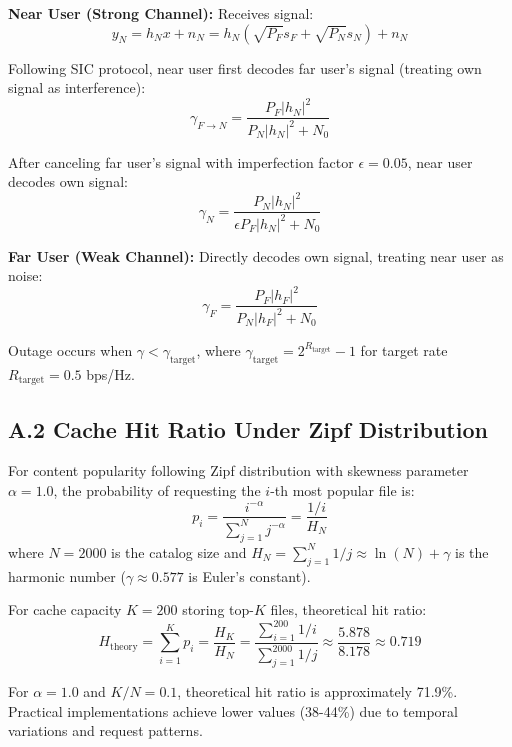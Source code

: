 \documentclass[12pt,a4paper]{article}
\begin{document}
\textbf{Near User (Strong Channel):} Receives signal:
\begin{equation}
y_N = h_N x + n_N = h_N(\sqrt{P_F} s_F + \sqrt{P_N} s_N) + n_N
\end{equation}

Following SIC protocol, near user first decodes far user's signal (treating own signal as interference):
\begin{equation}
\gamma_{F \rightarrow N} = \frac{P_F |h_N|^2}{P_N |h_N|^2 + N_0}
\end{equation}

After canceling far user's signal with imperfection factor $\epsilon = 0.05$, near user decodes own signal:
\begin{equation}
\gamma_N = \frac{P_N |h_N|^2}{\epsilon P_F |h_N|^2 + N_0}
\end{equation}

\textbf{Far User (Weak Channel):} Directly decodes own signal, treating near user as noise:
\begin{equation}
\gamma_F = \frac{P_F |h_F|^2}{P_N |h_F|^2 + N_0}
\end{equation}

Outage occurs when $\gamma < \gamma_{\text{target}}$, where $\gamma_{\text{target}} = 2^{R_{\text{target}}} - 1$ for target rate $R_{\text{target}} = 0.5$ bps/Hz.

\subsection*{A.2 Cache Hit Ratio Under Zipf Distribution}

For content popularity following Zipf distribution with skewness parameter $\alpha = 1.0$, the probability of requesting the $i$-th most popular file is:
\begin{equation}
p_i = \frac{i^{-\alpha}}{\sum_{j=1}^{N} j^{-\alpha}} = \frac{1/i}{H_N}
\end{equation}
where $N = 2000$ is the catalog size and $H_N = \sum_{j=1}^{N} 1/j \approx \ln(N) + \gamma$ is the harmonic number ($\gamma \approx 0.577$ is Euler's constant).

For cache capacity $K = 200$ storing top-$K$ files, theoretical hit ratio:
\begin{equation}
H_{\text{theory}} = \sum_{i=1}^{K} p_i = \frac{H_K}{H_N} = \frac{\sum_{i=1}^{200} 1/i}{\sum_{j=1}^{2000} 1/j} \approx \frac{5.878}{8.178} \approx 0.719
\end{equation}

For $\alpha = 1.0$ and $K/N = 0.1$, theoretical hit ratio is approximately 71.9\%. Practical implementations achieve lower values (38-44\%) due to temporal variations and request patterns.
\end{document}

